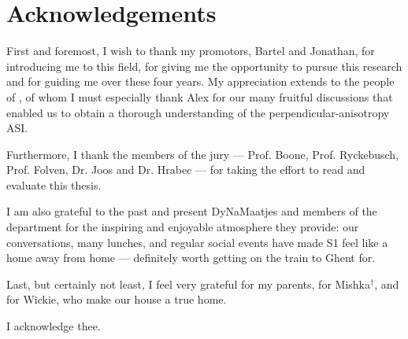 \newpage
\thispagestyle{empty}
\null
\newpage

\clearpage
\thispagestyle{empty}


\chapter*{Acknowledgements}\label{sec:Acknowledgements}
First and foremost, I wish to thank my promotors, Bartel and Jonathan, for introducing me to this field, for giving me the opportunity to pursue this research and for guiding me over these four years.
My appreciation extends to the people of \spinengine, of whom I must especially thank Alex for our many fruitful discussions that enabled us to obtain a thorough understanding of the perpendicular-anisotropy ASI. \\\par

Furthermore, I thank the members of the jury --- Prof. Boone, Prof. Ryckebusch, Prof. Folven, Dr. Joos and Dr. Hrabec --- for taking the effort to read and evaluate this thesis. \\\par

I am also grateful to the past and present DyNaMaatjes and members of the department for the inspiring and enjoyable atmosphere they provide: our conversations, many lunches, and regular social events have made S1 feel like a home away from home --- definitely worth getting on the train to Ghent for.
\\\par

Last, but certainly not least, I feel very grateful for my parents, for Mishka$^\dagger$, and for Wickie, who make our house a true home. \\\par

I acknowledge thee.
\clearpage
